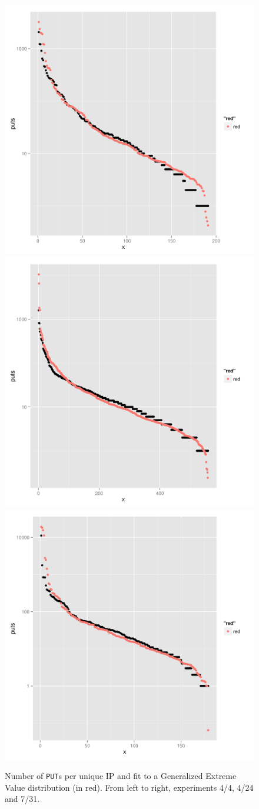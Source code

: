 \documentclass[journal,onecolumn]{IEEEtran}
\begin{document}
\begin{figure}[!htb]
\centering
\includegraphics[width=0.32\linewidth]{img/puts-openshift-4-4.png}
\includegraphics[width=0.32\linewidth]{img/puts-openshift-4-24.png}
\includegraphics[width=0.32\linewidth]{img/puts-openshift-7-31.png}
\caption{Number of {\tt PUT}s per unique IP and fit to a Generalized
  Extreme Value distribution (in red). From left to right, experiments 4/4, 4/24 and 7/31.}
\label{fig:puts:os}
\end{figure}
%
\end{document}
